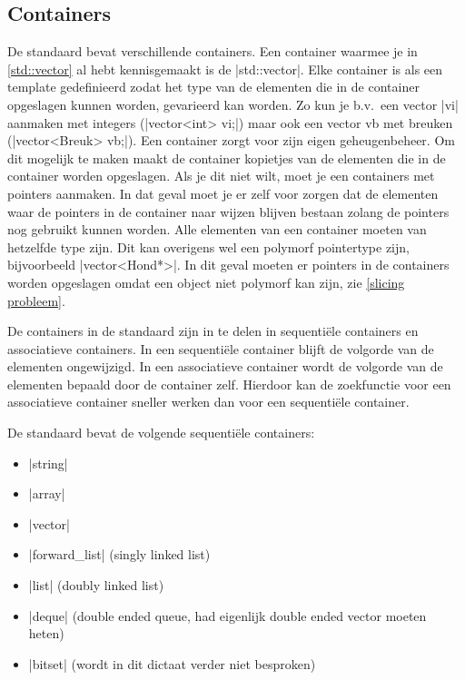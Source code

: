 \begin{cpplstShortInline}
\chapter{Containers}
\label{sec:containers}
De standaard \Cpp{}  bevat verschillende containers.
Een container waarmee je in \cref{std::vector} al hebt kennisgemaakt is de |std::vector|.
Elke container is als een template gedefinieerd zodat het type van de elementen die in de container opgeslagen kunnen worden, gevarieerd kan worden.
Zo kun je b.v.\ een vector |vi| aanmaken met integers (|vector<int> vi;|) maar ook een vector vb met breuken (|vector<Breuk> vb;|).
Een container zorgt voor zijn eigen geheugenbeheer.
Om dit mogelijk te maken maakt de container kopietjes van de elementen die in de container worden opgeslagen.
Als je dit niet wilt, moet je een containers met pointers aanmaken.
In dat geval moet je er zelf voor zorgen dat de elementen waar de pointers in de container naar wijzen blijven bestaan zolang de pointers nog gebruikt kunnen worden.
Alle elementen van een container moeten van hetzelfde type zijn.
Dit kan overigens wel een polymorf pointertype zijn, bijvoorbeeld |vector<Hond*>|.
In dit geval moeten er pointers in de containers worden opgeslagen omdat een object niet polymorf kan zijn, zie \cref{slicing probleem}.

De containers in de standaard \Cpp{}  zijn in te delen in sequentiële containers en associatieve containers.
In een sequentiële container blijft de volgorde van de elementen ongewijzigd.
In een associatieve container wordt de volgorde van de elementen bepaald door de container zelf.
Hierdoor kan de zoekfunctie voor een associatieve container sneller werken dan voor een sequentiële container.

De standaard \Cpp{}  bevat de volgende sequentiële containers:
\begin{itemize}
	\item |string|
	\item |array|
	\item |vector|
	\item |forward_list| (singly linked list)
	\item |list| (doubly linked list)
	\item |deque| (double ended queue, had eigenlijk double ended vector moeten heten)
	\item |bitset| (wordt in dit dictaat verder niet besproken)
\end{itemize}


\end{cpplstShortInline}
